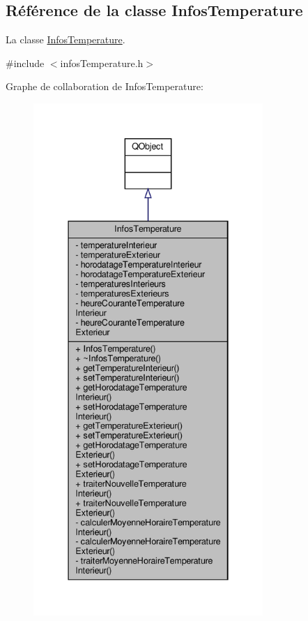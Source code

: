\hypertarget{class_infos_temperature}{}\subsection{Référence de la classe Infos\+Temperature}
\label{class_infos_temperature}


La classe \hyperlink{class_infos_temperature}{Infos\+Temperature}.  




{\ttfamily \#include $<$infos\+Temperature.\+h$>$}



Graphe de collaboration de Infos\+Temperature\+:\nopagebreak
\begin{figure}[H]
\begin{center}
\leavevmode
\includegraphics[height=550pt]{class_infos_temperature__coll__graph}
\end{center}
\end{figure}
